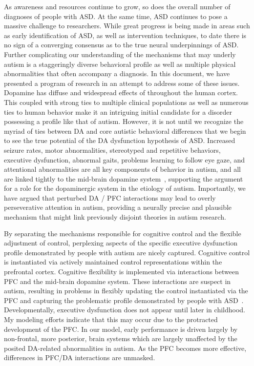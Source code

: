 %
%

As awareness and resources continue to grow, so does the overall number of diagnoses of people with ASD.  At the same time, ASD continues to pose a massive challenge to researchers.  While great progress is being made in areas such as early identification of ASD, as well as intervention techniques, to date there is no sign of a converging consensus as to the true neural underpinnings of ASD.  Further complicating our understanding of the mechanisms that may underly autism is a staggeringly diverse behavioral profile as well as multiple physical abnormalities that often accompany a diagnosis.  In this document, we have presented a program of research in an attempt to address some of these issues.  Dopamine has diffuse and widespread effects of throughout the human cortex. This coupled with strong ties to multiple clinical populations as well as numerous ties to human behavior make it an intriguing initial candidate for a disorder possessing a profile like that of autism.  However, it is not until we recognize the myriad of ties between DA and core autistic behavioral differences that we begin to see the true potential of the DA dysfunction hypothesis of ASD.  Increased seizure rates, motor abnormalities, stereotyped and repetitive behaviors, executive dysfunction, abnormal gaits, problems learning to follow eye gaze, and attentional abnormalities are all key components of behavior in autism, and all are linked tightly to the mid-brain dopamine system~\cite{RefWorks:99,RefWorks:100,RefWorks:102,HillEL:2004:AutismExecutiveDysfunction,RefWorks:1,RefWorks:3,RefWorks:5,RefWorks:2,RefWorks:109}, supporting the argument for a role for the dopaminergic system in the etiology of autism. Importantly, we have argued that perturbed DA / PFC interactions may lead to overly perseverative attention in autism, providing a neurally precise and plausible mechanism that might link previously disjoint theories in autism research. 

By separating the mechanisms responsible for cognitive control and the flexible adjustment of control, perplexing aspects of the specific executive dysfunction profile demonstrated by people with autism are nicely captured.  Cognitive control is instantiated via actively maintained control representations within the prefrontal cortex.  Cognitive flexibility is implemented via interactions between PFC and the mid-brain dopamine system.  These interactions are suspect in autism, resulting in problems in flexibly updating the control instantiated via the PFC and capturing the problematic profile demonstrated by people with ASD~\cite{HillEL:2004:AutismExecutiveDysfunction}.  Developmentally, executive dysfunction does not appear until later in childhood.  My modeling efforts indicate that this may occur due to the protracted development of the PFC.  In our model, early performance is driven largely by non-frontal, more posterior, brain systems which are largely unaffected by the posited DA-related abnormalities in autism.  As the PFC becomes more effective, differences in PFC/DA interactions are unmasked.  

